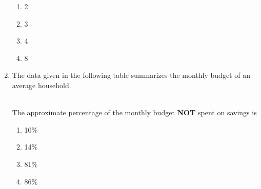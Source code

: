 \documentclass[journal]{IEEEtran}
\begin{document}
\begin{enumerate}
  \begin{enumerate}
   \item 2
   \item 3
   \item 4
   \item 8 \\
\end{enumerate}
\item The data given in the following table summarizes the monthly budget of an average household.
\begin{table}[h!]
  \centering
  
\end{table} \\
The approximate percentage of the monthly budget \textbf{NOT} spent on savings is
\begin{enumerate}
    \item 10\%
    \item 14\%
    \item 81\%
    \item 86\%
\end{enumerate}
			 \end{enumerate}
			 
\end{document}
